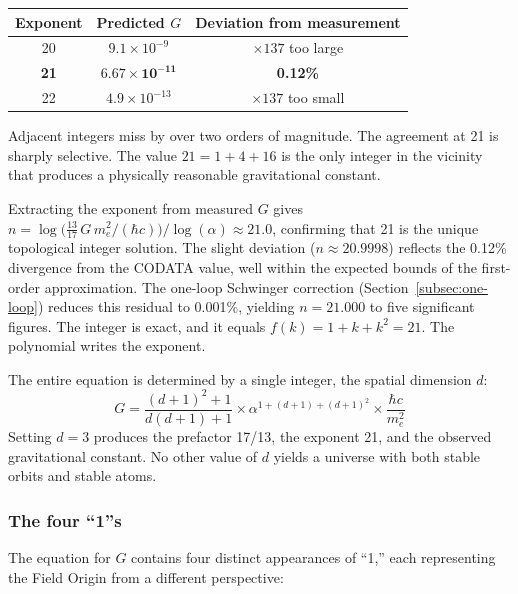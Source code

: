 \documentclass[aps,prd,preprint,superscriptaddress,showpacs,preprintnumbers,amsmath,amssymb,nofootinbib]{revtex4-2}
\begin{document}
\begin{center}
\begin{tabular}{ccc}
\toprule
\textbf{Exponent} & \textbf{Predicted $G$} & \textbf{Deviation from measurement} \\
\midrule
20 & $9.1 \times 10^{-9}$ & $\times 137$ too large \\
\textbf{21} & $\bm{6.67 \times 10^{-11}}$ & \textbf{0.12\%} \\
22 & $4.9 \times 10^{-13}$ & $\times 137$ too small \\
\bottomrule
\end{tabular}
\end{center}

Adjacent integers miss by over two orders of magnitude. The agreement at 21 is sharply selective. The value $21 = 1 + 4 + 16$ is the only integer in the vicinity that produces a physically reasonable gravitational constant.

Extracting the exponent from measured $G$ gives $n = \log\!\bigl(\tfrac{13}{17}\,G\,m_e^2/(\hbar c)\bigr) / \log(\alpha) \approx 21.0$, confirming that 21 is the unique topological integer solution. The slight deviation ($n \approx 20.9998$) reflects the 0.12\% divergence from the CODATA value, well within the expected bounds of the first-order approximation. The one-loop Schwinger correction (Section~\ref{subsec:one-loop}) reduces this residual to 0.001\%, yielding $n = 21.000$ to five significant figures. The integer is exact, and it equals $f(k) = 1 + k + k^2 = 21$. The polynomial writes the exponent.

The entire equation is determined by a single integer, the spatial dimension $d$:
\begin{equation}
G = \frac{(d+1)^2 + 1}{d(d+1) + 1} \times \alpha^{1 + (d+1) + (d+1)^2} \times \frac{\hbar c}{m_e^2}
\label{eq:G-general-d}
\end{equation}
Setting $d = 3$ produces the prefactor 17/13, the exponent 21, and the observed gravitational constant. No other value of $d$ yields a universe with both stable orbits and stable atoms.

\subsubsection*{The four ``1''s}

The equation for $G$ contains four distinct appearances of ``1,'' each representing the Field Origin from a different perspective:
\end{document}

